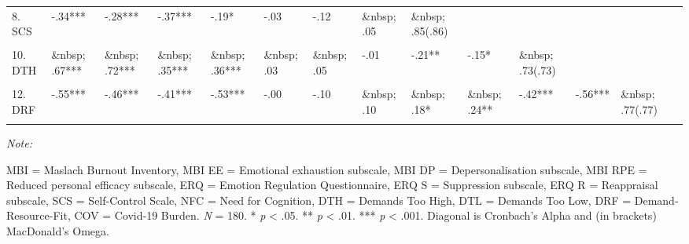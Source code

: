 \documentclass[
  english,
  man,floatsintext]{apa6}
\begin{document}
\begin{landscape}
\begin{table}
{\begin{threeparttable}
\begin{tabular}[t]{llllllllllllll}
8. SCS & -.34*** & -.28*** & -.37*** & -.19* & -.03 & -.12 & \&nbsp; .05 & \&nbsp; .85(.86) &  &  &  &  & \\
\cellcolor{gray!6}{9. NFC} & \cellcolor{gray!6}{-.25***} & \cellcolor{gray!6}{-.20**} & \cellcolor{gray!6}{-.22**} & \cellcolor{gray!6}{-.21**} & \cellcolor{gray!6}{-.01} & \cellcolor{gray!6}{-.18*} & \cellcolor{gray!6}{\&nbsp; .16*} & \cellcolor{gray!6}{\&nbsp; .22**} & \cellcolor{gray!6}{\&nbsp; .89(.89)} & \cellcolor{gray!6}{} & \cellcolor{gray!6}{} & \cellcolor{gray!6}{} & \cellcolor{gray!6}{}\\
10. DTH & \&nbsp; .67*** & \&nbsp; .72*** & \&nbsp; .35*** & \&nbsp; .36*** & \&nbsp; .03 & \&nbsp; .05 & -.01 & -.21** & -.15* & \&nbsp; .73(.73) &  &  & \\
\addlinespace
\cellcolor{gray!6}{11. DTL} & \cellcolor{gray!6}{\&nbsp; .44***} & \cellcolor{gray!6}{\&nbsp; .36***} & \cellcolor{gray!6}{\&nbsp; .38***} & \cellcolor{gray!6}{\&nbsp; .43***} & \cellcolor{gray!6}{\&nbsp; .01} & \cellcolor{gray!6}{\&nbsp; .16*} & \cellcolor{gray!6}{-.14} & \cellcolor{gray!6}{-.19*} & \cellcolor{gray!6}{-.16*} & \cellcolor{gray!6}{\&nbsp; .41***} & \cellcolor{gray!6}{\&nbsp; .73(.75)} & \cellcolor{gray!6}{} & \cellcolor{gray!6}{}\\
12. DRF & -.55*** & -.46*** & -.41*** & -.53*** & -.00 & -.10 & \&nbsp; .10 & \&nbsp; .18* & \&nbsp; .24** & -.42*** & -.56*** & \&nbsp; .77(.77) & \\
\cellcolor{gray!6}{13. COV} & \cellcolor{gray!6}{\&nbsp; .24**} & \cellcolor{gray!6}{\&nbsp; .32***} & \cellcolor{gray!6}{\&nbsp; .08} & \cellcolor{gray!6}{\&nbsp; .02} & \cellcolor{gray!6}{-.03} & \cellcolor{gray!6}{\&nbsp; .02} & \cellcolor{gray!6}{-.07} & \cellcolor{gray!6}{-.04} & \cellcolor{gray!6}{\&nbsp; .13} & \cellcolor{gray!6}{\&nbsp; .45***} & \cellcolor{gray!6}{\&nbsp; .10} & \cellcolor{gray!6}{-.13} & \cellcolor{gray!6}{\&nbsp; .77(.81)}\\
\bottomrule
\end{tabular}
\begin{tablenotes}
\item \textit{Note: } 
\item MBI = Maslach Burnout Inventory, MBI EE = Emotional exhaustion subscale, MBI DP = Depersonalisation subscale, MBI RPE = Reduced personal efficacy subscale, ERQ = Emotion Regulation Questionnaire, ERQ S = Suppression subscale, ERQ R = Reappraisal subscale, SCS = Self-Control Scale, NFC = Need for Cognition, DTH = Demands Too High, DTL = Demands Too Low, DRF = Demand-Resource-Fit, COV = Covid-19 Burden. \textit{N} = 180. * \textit{p} < .05. ** \textit{p} < .01. *** \textit{p} < .001. Diagonal is Cronbach's Alpha and (in brackets) MacDonald's Omega.
\end{tablenotes}
\end{threeparttable}}
\end{table}
\end{landscape}
\end{document}

